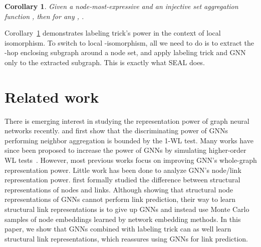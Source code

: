 \documentclass{article}
\newtheorem{corollary}{Corollary}
\begin{document}
\begin{corollary}\label{labeltrickthmlocal}
Given a node-most-expressive  and an injective set aggregation function , then for any , .
\end{corollary}

Corollary~\ref{labeltrickthmlocal} demonstrates labeling trick's power in the context of local isomorphism. To switch to local -isomorphism, all we need to do is to extract the -hop enclosing subgraph around a node set, and apply labeling trick and GNN only to the extracted subgraph. This is exactly what SEAL does. 






























\section{Related work}
There is emerging interest in studying the representation power of graph neural networks recently. \citet{xu2018powerful} and \citet{morris2019weisfeiler} first show that the discriminating power of GNNs performing neighbor aggregation is bounded by the 1-WL test. Many works have since been proposed to increase the power of GNNs by simulating higher-order WL tests~\citep{morris2019weisfeiler,maron2019provably,chen2019equivalence}. However, most previous works focus on improving GNN's whole-graph representation power. Little work has been done to analyze GNN's node/link representation power. 
\citet{Srinivasan2020On} first formally studied the difference between structural representations of nodes and links. Although showing that structural node representations of GNNs cannot perform link prediction, their way to learn structural link representations is to give up GNNs and instead use Monte Carlo samples of node embeddings learned by network embedding methods. In this paper, we show that GNNs combined with labeling trick can as well learn structural link representations, which reassures using GNNs for link prediction. 
\end{document}
